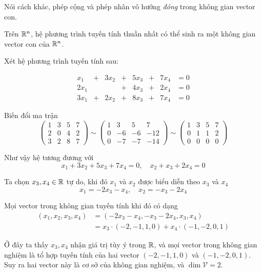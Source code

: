 Nói cách khác, phép cộng và phép nhân vô hướng \textit{đóng} trong
không gian vector con.

\begin{remark}
    Trên $\mathbb{R}^n$, hệ phương trình tuyến tính thuần nhất có thể sinh
    ra một không gian vector con của $\mathbb{R}^n$.
\end{remark}

\begin{example}
    Xét hệ phương trình tuyến tính sau:

    \begin{equation}
        \begin{array}{cccccccc}
            x_1 & + & 3x_2 & + & 5x_3 & + & 7x_4 & = 0 \\
            2x_1 & & & + & 4x_3 & + & 2x_4 & = 0 \\
            3x_1 & + & 2x_2 & + & 8x_3 & + & 7x_4 & = 0
        \end{array}
    \end{equation}

    Biến đổi ma trận
    \[
        \begin{pmatrix}
            1 & 3 & 5 & 7 \\
            2 & 0 & 4 & 2 \\
            3 & 2 & 8 & 7
        \end{pmatrix} \sim \begin{pmatrix}
            1 & 3 & 5 & 7 \\
            0 & -6 & -6 & -12 \\
            0 & -7 & -7 & -14
        \end{pmatrix} \sim \begin{pmatrix}
            1 & 3 & 5 & 7 \\
            0 & 1 & 1 & 2 \\
            0 & 0 & 0 & 0
        \end{pmatrix}
    \]

    Như vậy hệ tương đương với
    \[x_1 + 3x_2 + 5x_3 + 7x_4 = 0, \quad x_2 + x_3 + 2x_4 = 0\]

    Ta chọn $x_3, x_4 \in \mathbb{R}$ tự do, khi đó $x_1$ và $x_2$ được 
    biểu diễn theo $x_3$ và $x_4$ 
    \begin{equation}
        x_1 = -2x_3 - x_4, \quad x_2 = -x_3 - 2x_4
    \end{equation}

    Mọi vector trong không gian tuyến tính khi đó có dạng
    \begin{align*}
        (x_1, x_2, x_3, x_4) & = (-2x_3 - x_4, -x_3 - 2x_4, x_3, x_4)
        \\ & = x_3 \cdot (-2, -1, 1, 0) + x_4 \cdot (-1, -2, 0, 1) 
    \end{align*}

    Ở đây ta thấy $x_3, x_4$ nhận giá trị tùy ý trong $\mathbb{R}$, và
    mọi vector trong không gian nghiệm là tổ hợp tuyến tính của
    hai vector $(-2, -1, 1, 0)$ và $(-1, -2, 0, 1)$. Suy ra hai vector
    này là cơ sở của không gian nghiệm, và $\dim \mathcal{V} = 2$.

\end{example}
